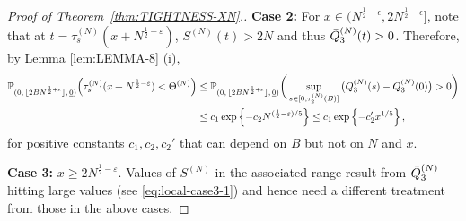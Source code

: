 \documentclass[11pt, reqno]{article}
\DeclarePairedDelimiter\autobracket{(}{)}
\newcommand{\br}[1]{\autobracket*{#1}}
\numberwithin{equation}{section}
\numberwithin{theorem}{section}
\newcommand\blue[1]{#1}
\begin{document}
\begin{proof}[Proof of Theorem~\ref{thm:TIGHTNESS-XN}.]
\noindent
\blue{\textbf{Case 2:}} For $x \in (N^{\frac{1}{2} - \epsilon}, 2N^{\frac{1}{2} - \epsilon}]$,
note that at $t=\tau^{(N)}_s(x+N^{\frac{1}{2}-\varepsilon})$, $S^{(N)}(t) > 2N$ and thus $\Bar{Q}^{(N)}_3(t)>0$.
Therefore, by Lemma \ref{lem:LEMMA-8} (i),
\begin{align}\label{middler}
 \mathbb{P}_{(0, \, \lfloor 2BN^{\frac{1}{2}+\varepsilon} \rfloor, \,\underline{0})}\br{\tau^{(N)}_s(x+N^{\frac{1}{2}-\varepsilon})<\Theta^{(N)} } &\le \mathbb{P}_{(0, \, \lfloor 2BN^{\frac{1}{2}+\varepsilon} \rfloor, \,\underline{0})}\bigg(\sup_{s \in [0,\tau^{(N)}_2(B)]}\big(\Bar{Q}^{(N)}_3(s)-\Bar{Q}^{(N)}_3(0)\big) >0\bigg)\nonumber\\
 &\le c_1 \exp\left\lbrace -c_2N^{(\frac{1}{2}-\varepsilon)/5}\right\rbrace \le c_1 \exp\left\lbrace - c_2' x^{1/5}\right\rbrace,
\end{align}
for positive constants $c_1, c_2, c_2'$ that can depend on $B$ but not on $N$ and $x$.

\noindent
\blue{\textbf{Case 3:} $x\geq 2N^{\frac{1}{2}-\varepsilon}$. Values of $S^{(N)}$ in the associated range result from $\Bar{Q}^{(N)}_3$ hitting large values (see \eqref{eq:local-case3-1}) and hence need a different treatment from those in the above cases.}


\end{proof}
\end{document}
